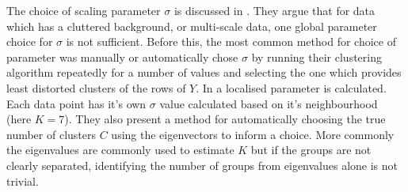 \documentclass[12pt]{report}		%
\begin{document}
The choice of scaling parameter $\sigma$ is discussed in \cite{Zelnik-Manor2004}. They argue that for data which has a cluttered background, or multi-scale data, one global parameter choice for $\sigma$ is not sufficient. Before this, the most common method for choice of parameter was manually or \cite{Ng2001} automatically chose $\sigma$ by running their clustering algorithm repeatedly for a number of values and selecting the one which provides least distorted clusters of the rows of $Y$. In \cite{Zelnik-Manor2004} a localised parameter is calculated. Each data point has it's own $\sigma$ value calculated based on it's neighbourhood (here $K = 7$). They also present a method for automatically choosing the true number of clusters $C$ using the eigenvectors to inform a choice. More commonly the eigenvalues are commonly used to estimate $K$ but if the groups are not clearly separated, identifying the number of groups from eigenvalues alone is not trivial. 



\end{document}
